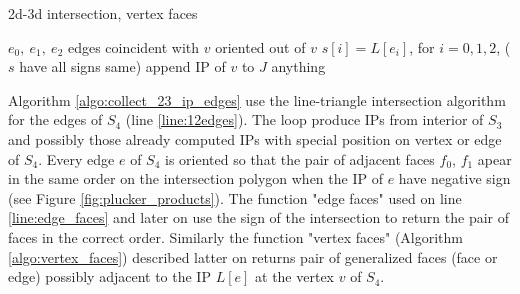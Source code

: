 \documentclass{elsarticle}
\begin{document}
\begin{algorithm}
  \caption{2d-3d intersection, vertex faces}  
  \label{algo:vertex_faces}
  
  \DontPrintSemicolon
  $e_0,\ e_1,\ e_2$ edges coincident with $v$ oriented out of $v$
  $s[i] = L[e_i]$, for $i=0,1,2$, \;
  \Else($s$ have all signs same){
    append IP of $v$ to $J$
    \return anything\;
  }  
\end{algorithm}

Algorithm \ref{algo:collect_23_ip_edges} use the line-triangle intersection algorithm for the edges of $S_4$ (line \ref{line:12edges}).
The loop produce IPs from interior of $S_3$ and possibly those already computed IPs with special position on vertex or edge of $S_4$. 
Every edge $e$ of $S_4$ is oriented so that the pair of adjacent faces $f_0$, $f_1$ apear in the same order on the intersection polygon when the 
IP of $e$ have negative sign (see Figure \ref{fig:plucker_products}). The function "edge faces" used on line \ref{line:edge_faces} and later on 
use the sign of the intersection to return the pair of faces in the correct order. 
Similarly the function "vertex faces" (Algorithm \ref{algo:vertex_faces}) described latter on
returns pair of generalized faces (face or edge) possibly adjacent to the IP $L[e]$ at the vertex $v$ of $S_4$.
\end{document}
